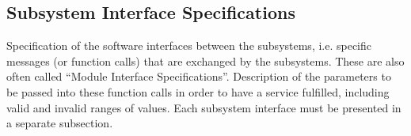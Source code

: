 \documentclass[12pt]{article}
\begin{document}
\subsection{Subsystem Interface Specifications} \label{subsystem interface}





Specification of the software interfaces between the subsystems,
i.e. specific messages (or function calls) that are exchanged by the subsystems.
These are also often called ``Module Interface Specifications''.
Description of the parameters to be passed into these function calls in order to have a service fulfilled,
including valid and invalid ranges of values.
Each subsystem interface must be presented in a separate subsection.
\end{document}
